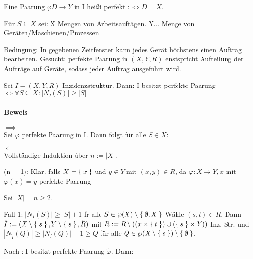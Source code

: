 \documentclass{../../meta/tudscript}
\begin{document}
        Eine \underline{Paarung} $\varphi D \rightarrow Y$ in I heißt perfekt $:\iff D = X$.

        Für $S \subseteq X$ sei:
        X Mengen  von Arbeitsauftägen. 
        Y... Menge von Geräten/Maschienen/Prozessen

        Bedingung: In gegebenen Zeitfenster kann jedes Gerät höchstens einen Auftrag bearbeiten.
        Gesucht: perfekte Paarung in $(X, Y, R)$ enstspricht Aufteilung der Aufträge auf Geräte,
        sodass jeder Auftrag ausgeführt wird.

        Sei $I = (X, Y, R)$ Inzidenzstruktur. Dann:
        I besitzt perfekte Paarung $\iff \forall S \subseteq X: |N_I (S)| \geq |S|$
        
        \paragraph{Beweis}
        \underline{$\implies$} \\

        Sei $\varphi$ perfekte Paarung in I. Dann folgt für alle $S \in X:$



        \underline{$\Leftarrow$} \\
        Vollständige Induktion über $n := |X|$.

         (n = 1): Klar. falls $X = \Set{x}$ und $y \in Y$ mit $(x,y) \in R$,
        da $\varphi: X \rightarrow Y, x$ mit $\varphi (x) = y$ perfekte Paarung

         Sei $|X| = n \geq 2$.

        Fall 1: $|N_I (S)| \geq |S| + 1$ fr alle $S \in \wp (X) \setminus \Set{\emptyset, X}$
        Wähle $(s, t) \in R$. Dann $\tilde{I} := (X \setminus \Set{s}, Y \setminus \Set{s}, \tilde{R})$
        mit $R := R \setminus ((x \times \Set{t}) \cup (\Set{s} \times Y))$ Inz. Str. und 
        $|N_{\tilde{I}} (Q)| \geq |N_I (Q)| -1 \geq Q$ für alle $Q \in \wp (X \setminus \Set{s}) \setminus \Set{\emptyset}$.

        Nach : I besitzt perfekte Paarung $\tilde{\varphi}$. Dann:
\end{document}
